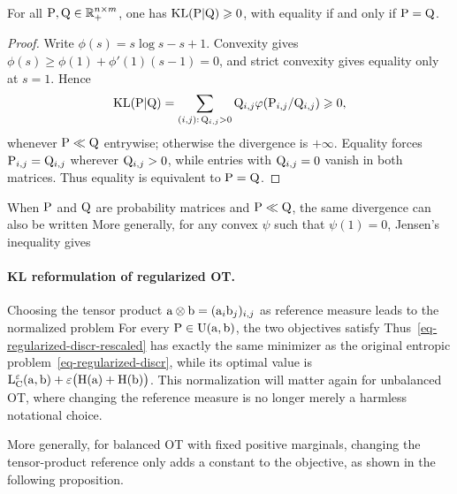 \begin{prop}\label{prop-kl-distance-like}
	For all $\P,\Q\in\RR_+^{n\times m}$, one has $\KLD(\P|\Q)\geq0$, with equality if and only if $\P=\Q$.
\end{prop}
\begin{proof}
	Write $\phi(s)=s\log s-s+1$. Convexity gives $\phi(s)\geq \phi(1)+\phi'(1)(s-1)=0$, and strict convexity gives equality only at $s=1$. Hence
	\[
		\KLD(\P|\Q)=\sum_{(i,j):\,\Q_{i,j}>0}\Q_{i,j}
		\phi(\P_{i,j}/\Q_{i,j})\geq0,
	\]
	whenever $\P\ll\Q$ entrywise; otherwise the divergence is $+\infty$. Equality forces $\P_{i,j}=\Q_{i,j}$ wherever $\Q_{i,j}>0$, while entries with $\Q_{i,j}=0$ vanish in both matrices. Thus equality is equivalent to $\P=\Q$.
\end{proof}

When $\P$ and $\Q$ are probability matrices and $\P\ll\Q$, the same divergence can also be written
More generally, for any convex $\psi$ such that $\psi(1)=0$, Jensen's inequality gives

\paragraph{KL reformulation of regularized OT.}
Choosing the tensor product $\a \otimes \b = (\a_i \b_j)_{i,j}$ as reference measure leads to the normalized problem
For every $\P\in\CouplingsD(\a,\b)$, the two objectives satisfy
Thus~\eqref{eq-regularized-discr-rescaled} has exactly the same minimizer as the original entropic problem~\eqref{eq-regularized-discr}, while its optimal value is
\(
	\MKD_\C^\epsilon(\a,\b)+\epsilon\bigl(\HD(\a)+\HD(\b)\bigr)
\).
This normalization will matter again for unbalanced OT, where changing the reference measure is no longer merely a harmless notational choice.

More generally, for balanced OT with fixed positive marginals, changing the tensor-product reference only adds a constant to the objective, as shown in the following proposition.

